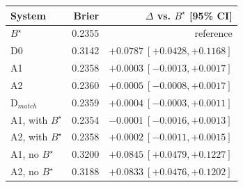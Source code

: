 \begin{tabular}{@{}lrr@{}}
\toprule
System & Brier & $\Delta$ vs. $B^\star$ [95\% CI] \\
\midrule
$B^\star$ & 0.2355 & reference \\
D0 & 0.3142 & $+0.0787\ [+0.0428,+0.1168]$ \\
A1 & 0.2358 & $+0.0003\ [-0.0013,+0.0017]$ \\
A2 & 0.2360 & $+0.0005\ [-0.0008,+0.0017]$ \\
D$_{match}$ & 0.2359 & $+0.0004\ [-0.0003,+0.0011]$ \\
\midrule
A1, with $B^\star$ & 0.2354 & $-0.0001\ [-0.0016,+0.0013]$ \\
A2, with $B^\star$ & 0.2358 & $+0.0002\ [-0.0011,+0.0015]$ \\
A1, no $B^\star$ & 0.3200 & $+0.0845\ [+0.0479,+0.1227]$ \\
A2, no $B^\star$ & 0.3188 & $+0.0833\ [+0.0476,+0.1202]$ \\
\bottomrule
\end{tabular}
